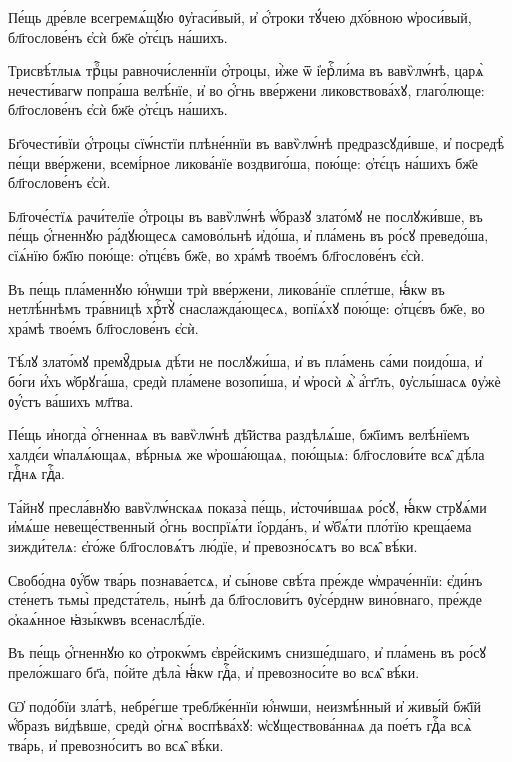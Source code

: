 \hKv Пе́щь дре́вле всегремѧ́щꙋю ᲂу҆гаси́вый, и҆ ѻ҆́троки тꙋ́чею  дх҃о́вною ѡ҆роси́вый, бл҃гослове́нъ є҆сѝ бж҃е ѻ҆тє́цъ  на́шихъ.  

\hKv Трисвѣ́тлыѧ трⷪ҇цы равночи́сленнїи ѻ҆́троцы, и҆̀же ѿ  і҆ерⷭ҇ли́ма въ вавѷлѡ́нѣ, царѧ̀ нечести́вагѡ попра́ша  велѣ́нїе, и҆ во ѻ҆́гнь вве́ржени ликовствова́хꙋ,  глаго́люще: бл҃гослове́нъ є҆сѝ бж҃е ѻ҆тє́цъ на́шихъ. 

\hKv Бг҃очести́вїи ѻ҆́троцы сїѡ́нстїи плѣне́ннїи въ вавѷлѡ́нѣ  предразсꙋди́вше, и҆ посредѣ̀ пе́щи вве́ржени, всемі́рное  ликова́нїе воздвиго́ша, пою́ще: ѻ҆тє́цъ на́шихъ бж҃е  бл҃гослове́нъ є҆сѝ. 

\hKv Бл҃гоче́стїѧ рачи́телїе ѻ҆́троцы въ вавѷлѡ́нѣ ѡ҆́бразꙋ  злато́мꙋ не послꙋжи́вше, въ пе́щь ѻ҆́гненнꙋю ра́дꙋющесѧ  самово́льнѣ и҆до́ша, и҆ пла́мень въ ро́сꙋ преведо́ша,  сїѧ́нїю бж҃їю пою́ще: ѻ҆тцє́въ бж҃е, во хра́мѣ твое́мъ  бл҃гослове́нъ є҆сѝ. 

\hKv Въ пе́щь пла́меннꙋю ю҆́нѡши трѝ вве́ржени, ликова́нїе  спле́тше, ꙗ҆́кѡ въ нетлѣ́ннѣмъ тра́вницѣ хрⷭ҇тꙋ̀  снаслажда́ющесѧ, вопїѧ́хꙋ пою́ще: ѻ҆тцє́въ бж҃е, во  хра́мѣ твое́мъ бл҃гослове́нъ є҆сѝ.  

\hKv Тѣ́лꙋ злато́мꙋ премꙋ̑дрыѧ дѣ́ти не послꙋжи́ша, и҆ въ  пла́мень са́ми поидо́ша, и҆ бо́ги и҆́хъ ѡ҆брꙋга́ша, средѝ  пла́мене возопи́ша, и҆ ѡ҆росѝ ѧ҆̀ а҆́гг҃лъ, ᲂу҆слы́шасѧ  ᲂу҆жѐ ᲂу҆́стъ ва́шихъ мл҃тва. 
%

\hKv Пе́щь и҆ногда̀ ѻ҆́гненнаѧ въ вавѷлѡ́нѣ дѣ̑йства  раздѣлѧ́ше, бж҃їимъ велѣ́нїемъ халдє́и ѡ҆палѧ́ющаѧ,  вѣ́рныѧ же ѡ҆роша́ющаѧ, пою́щыѧ: бл҃гослови́те всѧ̑ дѣ́ла  гдⷭ҇нѧ гдⷭ҇а. 
%

\hKv Та́йнꙋ пресла́внꙋю вавѷлѡ́нскаѧ показа̀  пе́щь, и҆сточи́вшаѧ ро́сꙋ, ꙗ҆́кѡ стрꙋѧ́ми и҆мѧ́ше  невеще́ственный ѻ҆́гнь воспрїѧ́ти і҆ѻрда́нъ, и҆ ѡ҆б̾ѧ́ти  пло́тїю креща́ема зижди́телѧ: є҆го́же бл҃гословѧ́тъ лю́дїе,  и҆ превозно́сѧтъ во всѧ̑ вѣ́ки. 

\hKv Свобо́дна ᲂу҆́бѡ тва́рь познава́етсѧ, и҆ сы́нове свѣ́та  пре́жде ѡ҆мраче́ннїи: є҆ди́нъ сте́нетъ  тьмы̀ предста́тель, ны́нѣ да бл҃гослови́тъ ᲂу҆се́рднѡ  вино́внаго, пре́жде ѻ҆каѧ́нное ꙗ҆зы́кѡвъ всенаслѣ́дїе. 
%

\hKv Въ пе́щь ѻ҆́гненнꙋю ко ѻ҆трокѡ́мъ є҆вре́йскимъ  снизше́дшаго, и҆ пла́мень въ ро́сꙋ прело́жшаго бг҃а, по́йте  дѣла̀ ꙗ҆́кѡ гдⷭ҇а, и҆ превозноси́те во всѧ̑ вѣ́ки. 

\hKv Ѡ҆ подо́бїи зла́тѣ, небре́гше требл҃же́ннїи ю҆́нѡши,  неизмѣ́нный и҆ живы́й бж҃їй ѡ҆́бразъ ви́дѣвше, средѝ  ѻ҆гнѧ̀ воспѣва́хꙋ: ѡ҆сꙋществова́ннаѧ да пое́тъ гдⷭ҇а всѧ̀  тва́рь, и҆ превозно́ситъ во всѧ̑ вѣ́ки. 
%

